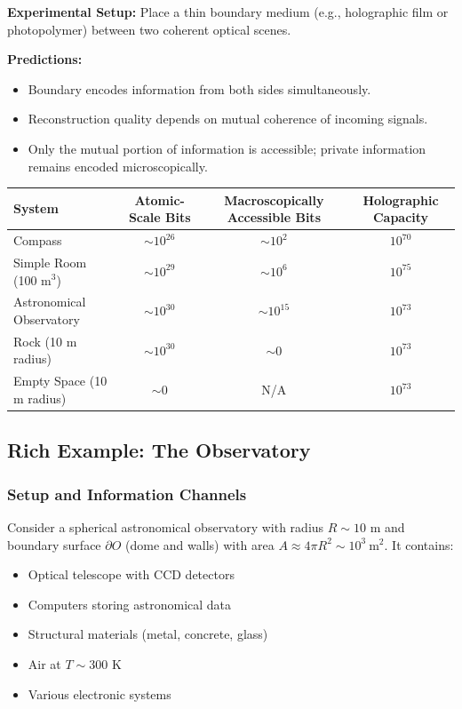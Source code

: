 ﻿\documentclass[12pt]{article}
\begin{document}
\textbf{Experimental Setup:} Place a thin boundary medium (e.g., holographic film or photopolymer) between two coherent optical scenes.


\textbf{Predictions:}
\begin{itemize}
  \item Boundary encodes information from both sides simultaneously.
  \item Reconstruction quality depends on mutual coherence of incoming signals.
  \item Only the mutual portion of information is accessible; private information remains encoded microscopically.
\end{itemize}


\begin{center}
\begin{tabular}{|l|c|c|c|}
\hline
\textbf{System} & \textbf{Atomic-Scale Bits} & \textbf{Macroscopically Accessible Bits} & \textbf{Holographic Capacity} \\
\hline
Compass & $\sim 10^{26}$ & $\sim 10^2$ & $10^{70}$ \\
Simple Room (100 m$^3$) & $\sim 10^{29}$ & $\sim 10^6$ & $10^{75}$ \\
Astronomical Observatory & $\sim 10^{30}$ & $\sim 10^{15}$ & $10^{73}$ \\
Rock (10 m radius) & $\sim 10^{30}$ & $\sim 0$ & $10^{73}$ \\
Empty Space (10 m radius) & $\sim 0$ & N/A & $10^{73}$ \\
\hline
\end{tabular}
\end{center}


\subsection{Rich Example: The Observatory}


\subsubsection{Setup and Information Channels}


Consider a spherical astronomical observatory with radius $R \sim 10$ m and boundary surface $\partial O$ (dome and walls) with area $A \approx 4\pi R^2 \sim 10^3~\mathrm{m}^2$. It contains:


\begin{itemize}
  \item Optical telescope with CCD detectors
  \item Computers storing astronomical data
  \item Structural materials (metal, concrete, glass)
  \item Air at $T \sim 300$ K
  \item Various electronic systems
\end{itemize}
\end{document}
